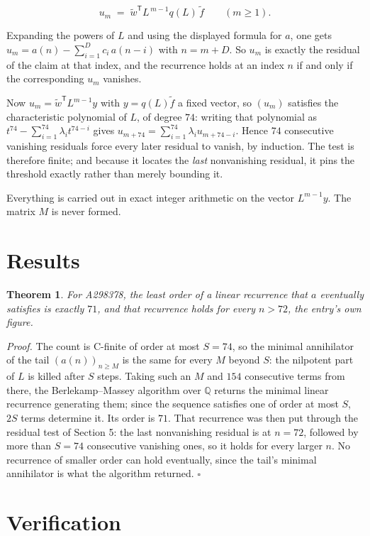 \documentclass[11pt]{article}
\newtheorem{theorem}{Theorem}
\theoremstyle{definition}
\begin{document}
\[u_m \;=\; \tilde w^{\mathsf T} L^{\,m-1} q(L)\,\tilde f \qquad (m \ge 1).\]

Expanding the powers of $L$ and using the displayed formula for $a$, one gets $u_m = a(n) - \sum_{i=1}^{D} c_i\,a(n-i)$ with $n = m + D$. So $u_m$ is exactly the residual of the claim at that index, and the recurrence holds at an index $n$ if and only if the corresponding $u_m$ vanishes.

Now $u_m = \tilde w^{\mathsf T} L^{m-1} y$ with $y = q(L)\tilde f$ a fixed vector, so $(u_m)$ satisfies the characteristic polynomial of $L$, of degree $74$: writing that polynomial as $t^{74} - \sum_{i=1}^{74} \lambda_i t^{74-i}$ gives $u_{m+74} = \sum_{i=1}^{74} \lambda_i u_{m+74-i}$. Hence $74$ consecutive vanishing residuals force every later residual to vanish, by induction. The test is therefore finite; and because it locates the {\itshape last} nonvanishing residual, it pins the threshold exactly rather than merely bounding it.

Everything is carried out in exact integer arithmetic on the vector $L^{m-1}y$. The matrix $M$ is never formed.

\section{Results}

\begin{theorem} For A298378, the least order of a linear recurrence that $a$ eventually satisfies is exactly $71$, and that recurrence holds for every $n > 72$, the entry's own figure.\end{theorem}

{\itshape Proof.} The count is C-finite of order at most $S = 74$, so the minimal annihilator of the tail $(a(n))_{n \ge M}$ is the same for every $M$ beyond $S$: the nilpotent part of $L$ is killed after $S$ steps. Taking such an $M$ and $154$ consecutive terms from there, the Berlekamp--Massey algorithm over $\mathbb{Q}$ returns the minimal linear recurrence generating them; since the sequence satisfies one of order at most $S$, $2S$ terms determine it. Its order is $71$. That recurrence was then put through the residual test of Section 5: the last nonvanishing residual is at $n = 72$, followed by more than $S = 74$ consecutive vanishing ones, so it holds for every larger $n$. No recurrence of smaller order can hold eventually, since the tail's minimal annihilator is what the algorithm returned. $\square$

\section{Verification}
\end{document}
